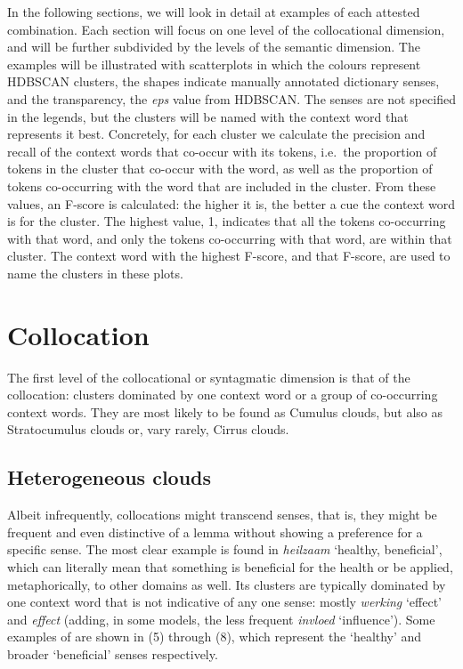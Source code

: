 \documentclass[
]{book}
\begin{document}
In the following sections, we will look in detail at examples of each attested combination. Each section will focus on one level of the collocational dimension, and will be further subdivided by the levels of the semantic dimension.
The examples will be illustrated with scatterplots in which the colours represent HDBSCAN clusters, the shapes indicate manually annotated dictionary senses, and the transparency, the \emph{eps} value from HDBSCAN. The senses are not specified in the legends, but the clusters will be named with the context word that represents it best. Concretely, for each cluster we calculate the precision and recall of the context words that co-occur with its tokens, i.e.~the proportion of tokens in the cluster that co-occur with the word, as well as the proportion of tokens co-occurring with the word that are included in the cluster. From these values, an F-score is calculated: the higher it is, the better a cue the context word is for the cluster. The highest value, 1, indicates that all the tokens co-occurring with that word, and only the tokens co-occurring with that word, are within that cluster. The context word with the highest F-score, and that F-score, are used to name the clusters in these plots.

\hypertarget{collocation}{%
\section{Collocation}\label{collocation}}

The first level of the collocational or syntagmatic dimension is that of the collocation: clusters dominated by one context word or a group of co-occurring context words. They are most likely to be found as Cumulus clouds, but also as Stratocumulus clouds or, vary rarely, Cirrus clouds.

\hypertarget{heterogeneous-clouds}{%
\subsection{Heterogeneous clouds}\label{heterogeneous-clouds}}

Albeit infrequently, collocations might transcend senses, that is, they might be frequent and even distinctive of a lemma without showing a preference for a specific sense.
The most clear example is found in \emph{heilzaam} `healthy, beneficial', which can literally mean that something is beneficial for the health or be applied, metaphorically, to other domains as well. Its clusters are typically dominated by one context word that is not indicative of any one sense: mostly \emph{werking} `effect' and \emph{effect} (adding, in some models, the less frequent \emph{invloed} `influence'). Some examples of are shown in (5) through (8), which represent the `healthy' and broader `beneficial' senses respectively.
\end{document}
